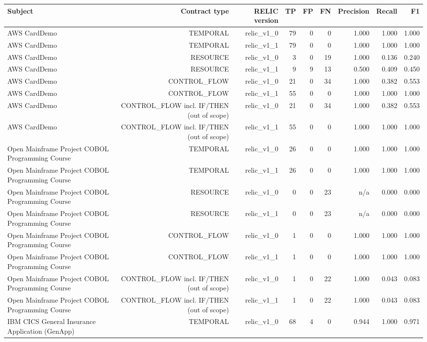 \begin{tabular}{lrrrrrrrr}
\toprule
Subject & Contract type & RELIC version & TP & FP & FN & Precision & Recall & F1 \\
\midrule
AWS CardDemo & TEMPORAL & relic\_v1\_0 & 79 & 0 & 0 & 1.000 & 1.000 & 1.000 \\
AWS CardDemo & TEMPORAL & relic\_v1\_1 & 79 & 0 & 0 & 1.000 & 1.000 & 1.000 \\
AWS CardDemo & RESOURCE & relic\_v1\_0 & 3 & 0 & 19 & 1.000 & 0.136 & 0.240 \\
AWS CardDemo & RESOURCE & relic\_v1\_1 & 9 & 9 & 13 & 0.500 & 0.409 & 0.450 \\
AWS CardDemo & CONTROL\_FLOW & relic\_v1\_0 & 21 & 0 & 34 & 1.000 & 0.382 & 0.553 \\
AWS CardDemo & CONTROL\_FLOW & relic\_v1\_1 & 55 & 0 & 0 & 1.000 & 1.000 & 1.000 \\
AWS CardDemo & CONTROL\_FLOW incl. IF/THEN (out of scope) & relic\_v1\_0 & 21 & 0 & 34 & 1.000 & 0.382 & 0.553 \\
AWS CardDemo & CONTROL\_FLOW incl. IF/THEN (out of scope) & relic\_v1\_1 & 55 & 0 & 0 & 1.000 & 1.000 & 1.000 \\
Open Mainframe Project COBOL Programming Course & TEMPORAL & relic\_v1\_0 & 26 & 0 & 0 & 1.000 & 1.000 & 1.000 \\
Open Mainframe Project COBOL Programming Course & TEMPORAL & relic\_v1\_1 & 26 & 0 & 0 & 1.000 & 1.000 & 1.000 \\
Open Mainframe Project COBOL Programming Course & RESOURCE & relic\_v1\_0 & 0 & 0 & 23 & n/a & 0.000 & 0.000 \\
Open Mainframe Project COBOL Programming Course & RESOURCE & relic\_v1\_1 & 0 & 0 & 23 & n/a & 0.000 & 0.000 \\
Open Mainframe Project COBOL Programming Course & CONTROL\_FLOW & relic\_v1\_0 & 1 & 0 & 0 & 1.000 & 1.000 & 1.000 \\
Open Mainframe Project COBOL Programming Course & CONTROL\_FLOW & relic\_v1\_1 & 1 & 0 & 0 & 1.000 & 1.000 & 1.000 \\
Open Mainframe Project COBOL Programming Course & CONTROL\_FLOW incl. IF/THEN (out of scope) & relic\_v1\_0 & 1 & 0 & 22 & 1.000 & 0.043 & 0.083 \\
Open Mainframe Project COBOL Programming Course & CONTROL\_FLOW incl. IF/THEN (out of scope) & relic\_v1\_1 & 1 & 0 & 22 & 1.000 & 0.043 & 0.083 \\
IBM CICS General Insurance Application (GenApp) & TEMPORAL & relic\_v1\_0 & 68 & 4 & 0 & 0.944 & 1.000 & 0.971 \\

\end{tabular}
